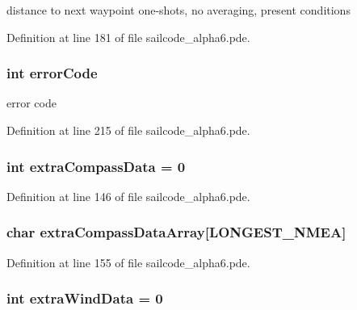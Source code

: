 distance to next waypoint one-\/shots, no averaging, present conditions 



\-Definition at line 181 of file sailcode\-\_\-alpha6.\-pde.

\hypertarget{group__group1_gab675a39a0c7f0587be9ae6734db7ac80}{
\subsubsection[{error\-Code}]{\setlength{\rightskip}{0pt plus 5cm}int {\bf error\-Code}}}
\label{group__group1_gab675a39a0c7f0587be9ae6734db7ac80}


error code 



\-Definition at line 215 of file sailcode\-\_\-alpha6.\-pde.

\hypertarget{group__group1_gaafded9aee7842e71393cafc5ac68d921}{
\subsubsection[{extra\-Compass\-Data}]{\setlength{\rightskip}{0pt plus 5cm}int {\bf extra\-Compass\-Data} = 0}}
\label{group__group1_gaafded9aee7842e71393cafc5ac68d921}


\-Definition at line 146 of file sailcode\-\_\-alpha6.\-pde.

\hypertarget{group__group1_ga87dbc2b6143e295eae5c571f1b5f460d}{
\subsubsection[{extra\-Compass\-Data\-Array}]{\setlength{\rightskip}{0pt plus 5cm}char {\bf extra\-Compass\-Data\-Array}\mbox{[}\-L\-O\-N\-G\-E\-S\-T\-\_\-\-N\-M\-E\-A\mbox{]}}}
\label{group__group1_ga87dbc2b6143e295eae5c571f1b5f460d}


\-Definition at line 155 of file sailcode\-\_\-alpha6.\-pde.

\hypertarget{group__group1_gaf9d919ceea98cf74d8ee327ca87871ee}{
\subsubsection[{extra\-Wind\-Data}]{\setlength{\rightskip}{0pt plus 5cm}int {\bf extra\-Wind\-Data} = 0}}
\label{group__group1_gaf9d919ceea98cf74d8ee327ca87871ee}


